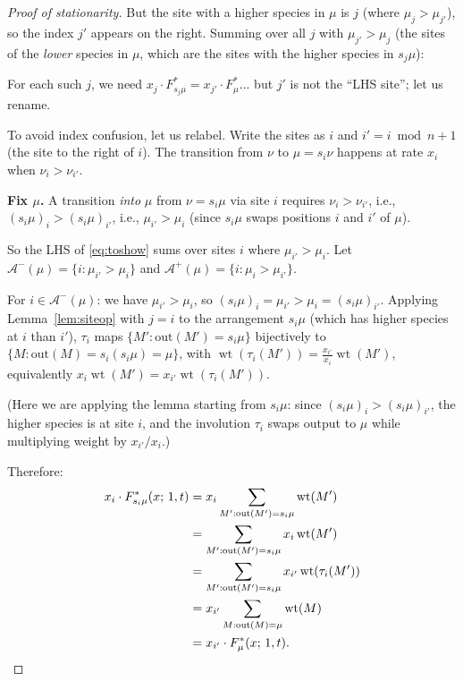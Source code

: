 \documentclass[12pt]{article}
\theoremstyle{definition}
\DeclareMathOperator{\wt}{wt}
\begin{document}
\begin{proof}[Proof of stationarity]
But the site with a higher species in $\mu$ is $j$ (where $\mu_j > \mu_{j'}$),
so the index $j'$ appears on the right.  Summing over all $j$ with
$\mu_{j'} > \mu_j$ (the sites of the \emph{lower} species in $\mu$, which are
the sites with the higher species in $s_j\mu$):

For each such $j$, we need $x_j \cdot F^*_{s_j\mu} = x_{j'} \cdot
F^*_\mu$... but $j'$ is not the ``LHS site''; let us rename.

\medskip

To avoid index confusion, let us relabel.  Write the sites as $i$ and
$i' = i \bmod n + 1$ (the site to the right of $i$).  The transition from
$\nu$ to $\mu = s_i \nu$ happens at rate $x_i$ when $\nu_i > \nu_{i'}$.

\textbf{Fix $\mu$.}  A transition \emph{into} $\mu$ from $\nu = s_i\mu$ via
site $i$ requires $\nu_i > \nu_{i'}$, i.e., $(s_i\mu)_i > (s_i\mu)_{i'}$,
i.e., $\mu_{i'} > \mu_i$ (since $s_i\mu$ swaps positions $i$ and $i'$ of $\mu$).

So the LHS of \eqref{eq:toshow} sums over sites $i$ where $\mu_{i'} > \mu_i$.
Let $\mathcal{A}^-(\mu) = \{i : \mu_{i'} > \mu_i\}$ and
$\mathcal{A}^+(\mu) = \{i : \mu_i > \mu_{i'}\}$.

\medskip

For $i \in \mathcal{A}^-(\mu)$: we have $\mu_{i'} > \mu_i$, so
$(s_i\mu)_i = \mu_{i'} > \mu_i = (s_i\mu)_{i'}$.  Applying
Lemma~\ref{lem:siteop} with $j = i$ to the arrangement $s_i\mu$ (which has
higher species at $i$ than $i'$), $\tau_i$ maps
$\{M' : \text{out}(M') = s_i\mu\}$ bijectively to
$\{M : \text{out}(M) = s_i(s_i\mu) = \mu\}$, with
$\wt(\tau_i(M')) = \frac{x_{i'}}{x_i}\wt(M')$, equivalently
$x_i \wt(M') = x_{i'} \wt(\tau_i(M'))$.

(Here we are applying the lemma starting from $s_i\mu$: since $(s_i\mu)_i >
(s_i\mu)_{i'}$, the higher species is at site $i$, and the involution $\tau_i$
swaps output to $\mu$ while multiplying weight by $x_{i'}/x_i$.)

Therefore:
\begin{align}
  x_i \cdot F^*_{s_i\mu}(x;\,1,t)
  &= x_i \sum_{M' : \text{out}(M')=s_i\mu} \wt(M') \notag\\
  &= \sum_{M' : \text{out}(M')=s_i\mu} x_i \wt(M') \notag\\
  &= \sum_{M' : \text{out}(M')=s_i\mu} x_{i'} \wt(\tau_i(M')) \notag\\
  &= x_{i'} \sum_{M : \text{out}(M)=\mu} \wt(M) \notag\\
  &= x_{i'} \cdot F^*_\mu(x;\,1,t). \label{eq:keyrel}
\end{align}


\end{proof}
\end{document}
